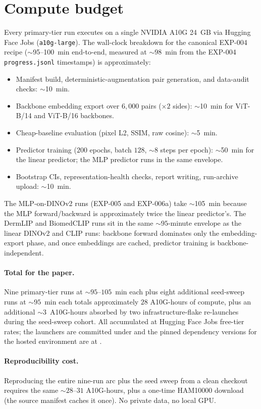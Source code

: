 \section{Compute budget}
\label{app:compute-budget}

Every primary-tier run executes on a single NVIDIA A10G 24~GB via
Hugging Face Jobs (\texttt{a10g-large}). The wall-clock breakdown for
the canonical EXP-004 recipe ($\sim$95--100~min end-to-end, measured at
$\sim$$98$~min from the EXP-004 \texttt{progress.jsonl} timestamps) is
approximately:

\begin{itemize}
\item Manifest build, deterministic-augmentation pair generation, and
      data-audit checks: $\sim$10~min.
\item Backbone embedding export over $6{,}000$ pairs ($\times 2$ sides):
      $\sim$10~min for ViT-B/14 and ViT-B/16 backbones.
\item Cheap-baseline evaluation (pixel L2, SSIM, raw cosine): $\sim$5~min.
\item Predictor training ($200$ epochs, batch $128$, $\sim$8 steps per
      epoch): $\sim$50~min for the linear predictor; the MLP predictor
      runs in the same envelope.
\item Bootstrap CIs, representation-health checks, report writing,
      run-archive upload: $\sim$10~min.
\end{itemize}

The MLP-on-DINOv2 runs (EXP-005 and EXP-006a) take $\sim$105~min
because the MLP forward/backward is approximately twice the linear
predictor's. The DermLIP and BiomedCLIP runs sit in the same
$\sim$$95$-minute envelope as the linear DINOv2 and CLIP runs: backbone
forward dominates only the embedding-export phase, and once
embeddings are cached, predictor training is backbone-independent.

\paragraph{Total for the paper.} Nine primary-tier runs at
$\sim$$95$--$105$~min each plus eight additional seed-sweep runs at
$\sim$$95$~min each
totals approximately $28$ A10G-hours of compute, plus an additional
$\sim$3~A10G-hours absorbed by two infrastructure-flake re-launches
during the seed-sweep cohort. All accumulated at Hugging Face Jobs
free-tier rates; the launchers are committed under 
and the pinned dependency versions for the hosted environment are at
.

\paragraph{Reproducibility cost.} Reproducing the entire nine-run arc
plus the seed sweep from a clean checkout requires the same
$\sim$$28$--$31$ A10G-hours, plus a one-time HAM10000 download (the source manifest
caches it once). No private data, no local GPU.
